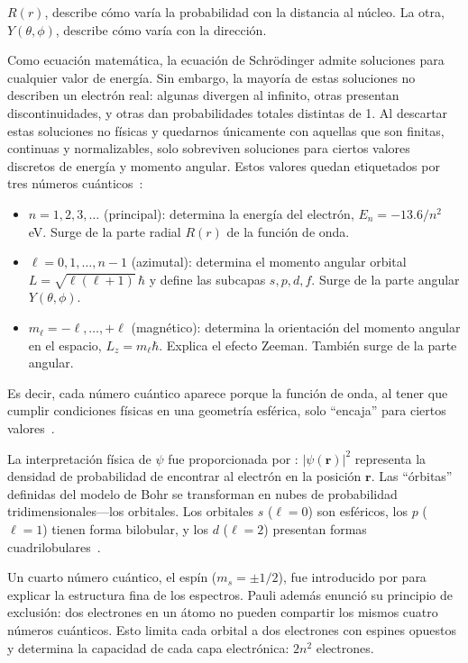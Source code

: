 \documentclass[11pt,a4paper,spanish]{book}
\begin{document}
\(R(r)\), describe cómo varía la probabilidad con la distancia al
núcleo. La otra, \(Y(\theta,\phi)\), describe cómo varía con la dirección.

Como ecuación matemática, la ecuación de Schrödinger admite
soluciones para cualquier valor de energía. Sin embargo, la mayoría
de estas soluciones no describen un electrón real: algunas divergen
al infinito, otras presentan discontinuidades, y otras dan
probabilidades totales distintas de 1. Al descartar estas soluciones
no físicas y quedarnos únicamente con aquellas que son finitas,
continuas y normalizables, solo sobreviven soluciones para ciertos
valores discretos de energía y momento angular. Estos valores quedan
etiquetados por tres números cuánticos~\citep{schrodinger1926}:

\begin{itemize}[nosep]
  \item \(n = 1, 2, 3, \ldots\) (principal): determina la energía del
    electrón, \(E_n = -13.6/n^2\) eV. Surge de la parte radial
    \(R(r)\) de la función de onda.
  \item \(\ell = 0, 1, \ldots, n-1\) (azimutal): determina el momento
    angular orbital \(L = \sqrt{\ell(\ell+1)}\,\hbar\) y define las
    subcapas \(s, p, d, f\). Surge de la parte angular \(Y(\theta, \phi)\).
  \item \(m_\ell = -\ell, \ldots, +\ell\) (magnético): determina la
    orientación del momento angular en el espacio, \(L_z =
    m_\ell\hbar\). Explica el efecto Zeeman. También surge de la parte angular.
\end{itemize}

Es decir, cada número cuántico aparece porque la función de onda, al
tener que cumplir condiciones físicas en una geometría esférica, solo
``encaja'' para ciertos valores~\citep{schrodinger1926}.

La interpretación física de \(\psi\) fue proporcionada por
\cite{born1926}: \(|\psi(\mathbf{r})|^2\) representa la densidad de
probabilidad de encontrar al electrón en la posición \(\mathbf{r}\).
Las ``órbitas'' definidas del modelo de Bohr se transforman en nubes
de probabilidad tridimensionales—los orbitales. Los orbitales \(s\)
(\(\ell = 0\)) son esféricos, los \(p\) (\(\ell = 1\)) tienen forma
bilobular, y los \(d\) (\(\ell = 2\)) presentan formas
cuadrilobulares~\citep{born1926}.

Un cuarto número cuántico, el espín (\(m_s = \pm 1/2\)), fue
introducido por \cite{pauli1925} para explicar la estructura fina de
los espectros. Pauli además enunció su principio de exclusión: dos
electrones en un átomo no pueden compartir los mismos cuatro números
cuánticos. Esto limita cada orbital a dos electrones con espines
opuestos y determina la capacidad de cada capa electrónica:
\(2n^2\) electrones.
\end{document}
